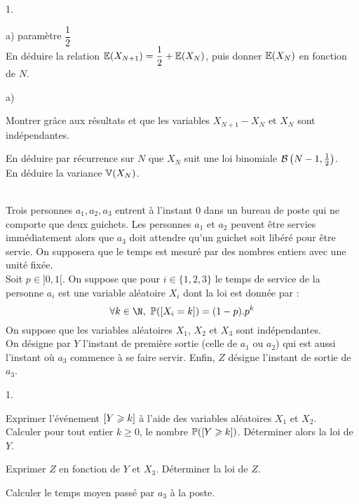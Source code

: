 \documentclass[11pt]{article}%
\begin{document}
\begin{exercice}
\begin{noliste}{1.}
\begin{noliste}{a)}
paramètre $\dfrac{1}{2}$\\
En déduire la relation $\mathbb{E}(X_{N+1})=\dfrac{1}{2}+\mathbb{E}(X_N)$, puis donner 
$\mathbb{E}(X_N)$ en fonction de $N$.
\end{noliste}
\item
\begin{noliste}{a)}
\item
Montrer grâce aux résultats  et  que les 
variables $X_{N+1}-X_N$ et $X_N$ sont indépendantes.
\item
En déduire par récurrence sur $N$ que $X_N$ suit une loi binomiale $ 
\mathcal{B}\left(N-1, \frac{1}{2}\right)$.\\ 
En déduire la variance $\mathbb{V}(X_N)$.
\end{noliste}
\end{noliste}
\end{exercice}




\begin{exercice}~\\
Trois personnes $a_1,a_2,a_3$ entrent à l'instant $0$ dans un bureau de 
poste qui ne comporte que deux guichets. Les personnes $a_1$ et $a_2$ 
peuvent être servies immédiatement alors que $a_3$ doit attendre qu'un 
guichet soit libéré pour être servie. On supposera que le temps est 
mesuré par des nombres entiers avec une unité fixée.\\
Soit $p \in ]0,1[$. On suppose que pour $i \in \{1,2,3\}$ le temps de 
service de la personne $a_i$ est une variable aléatoire $X_i$ dont la 
loi est donnée par : 
\[
\forall k \in \N, \ \Prob(\Ev{X_i=k})=(1-p).p^k
\]
On suppose que les variables aléatoires $X_1$, $X_2$ et $X_3$ sont 
indépendantes.\\
On désigne par $Y$ l'instant de première sortie (celle de $a_1$ ou 
$a_2$) qui est aussi l'instant où $a_3$ commence à se faire servir. 
Enfin, $Z$ désigne l'instant de sortie de $a_3$.
\begin{noliste}{1.}
\item
Exprimer l'événement $\left[ {Y \geqslant k} \right]$ à l'aide des variables aléatoires 
$X_1$ et $X_2$.\\
Calculer pour tout entier $k \geq 0$, le nombre $\mathbb{P}(\left[ {Y \geqslant 
k} \right])$. Déterminer alors la loi de $Y$.
\item
Exprimer $Z$ en fonction de $Y$ et $X_3$. Déterminer la loi de $Z$.
\item
Calculer le temps moyen passé par $a_3$ à la poste.
\end{noliste}
\end{exercice}
\end{document}
